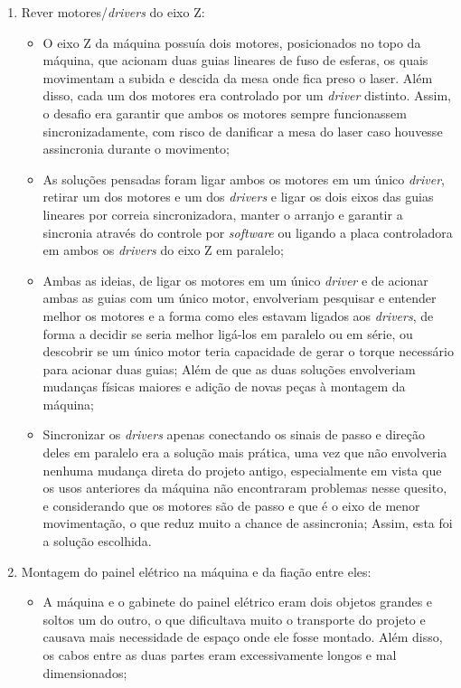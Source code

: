\documentclass[
	article,			%
	11pt,				%
	oneside,			%
	a4paper,			%
	section=TITLE,		%
	english,			%
	brazil,				%
	sumario=tradicional
	]{abntex2}
\begin{document}
\begin{enumerate}
\begin{itemize}
    \end{itemize}
    \item Rever motores/\textit{drivers} do eixo Z:
    \begin{itemize}
        \item O eixo Z da máquina possuía dois motores, posicionados no topo da máquina, que acionam duas guias lineares de fuso de esferas, os quais movimentam a subida e descida da mesa onde fica preso o laser. Além disso, cada um dos motores era controlado por um \textit{driver} distinto. Assim, o desafio era garantir que ambos os motores sempre funcionassem sincronizadamente, com risco de danificar a mesa do laser caso houvesse assincronia durante o movimento;
        \item As soluções pensadas foram ligar ambos os motores em um único \textit{driver}, retirar um dos motores e um dos \textit{drivers} e ligar os dois eixos das guias lineares por correia sincronizadora, manter o arranjo e garantir a sincronia através do controle por \textit{software} ou ligando a placa controladora em ambos os \textit{drivers} do eixo Z em paralelo;
        \item Ambas as ideias, de ligar os motores em um único \textit{driver} e de acionar ambas as guias com um único motor, envolveriam pesquisar e entender melhor os motores e a forma como eles estavam ligados aos \textit{drivers}, de forma a decidir se seria melhor ligá-los em paralelo ou em série, ou descobrir se um único motor teria capacidade de gerar o torque necessário para acionar duas guias; Além de que as duas soluções envolveriam mudanças físicas maiores e adição de novas peças à montagem da máquina;
        \item Sincronizar os \textit{drivers} apenas conectando os sinais de passo e direção deles em paralelo era a solução mais prática, uma vez que não envolveria nenhuma mudança direta do projeto antigo, especialmente em vista que os usos anteriores da máquina não encontraram problemas nesse quesito, e considerando que os motores são de passo e que é o eixo de menor movimentação, o que reduz muito a chance de assincronia; Assim, esta foi a solução escolhida. 
    \end{itemize}
    \item Montagem do painel elétrico na máquina e da fiação entre eles:
    \begin{itemize}
        \item A máquina e o gabinete do painel elétrico eram dois objetos grandes e soltos um do outro, o que dificultava muito o transporte do projeto e causava mais necessidade de espaço onde ele fosse montado. Além disso, os cabos entre as duas partes eram excessivamente longos e mal dimensionados;

\end{itemize}
\end{enumerate}
\end{document}
